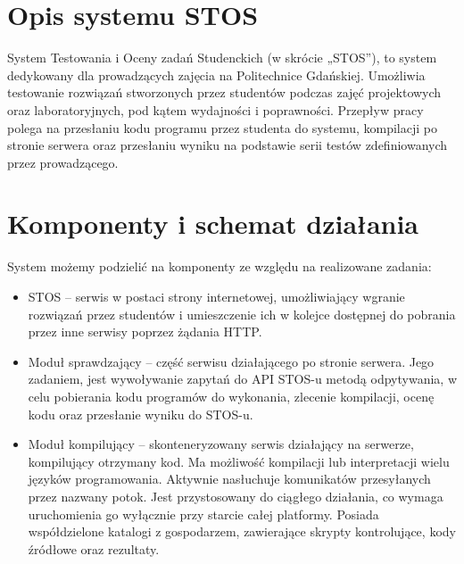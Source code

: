 \section{Opis systemu STOS}
\indent System Testowania i Oceny zadań Studenckich (w skrócie „STOS”), to system dedykowany dla prowadzących zajęcia na Politechnice Gdańskiej. Umożliwia testowanie rozwiązań stworzonych przez studentów podczas zajęć projektowych oraz laboratoryjnych, pod kątem wydajności i poprawności. Przepływ pracy polega na przesłaniu kodu programu przez studenta do systemu, kompilacji po stronie serwera oraz przesłaniu wyniku na podstawie serii testów zdefiniowanych przez prowadzącego.

\section{Komponenty i schemat działania}
System możemy podzielić na komponenty ze względu na realizowane zadania:
\begin{itemize}
    \item STOS -- serwis w postaci strony internetowej, umożliwiający wgranie rozwiązań przez studentów i umieszczenie ich w kolejce dostępnej do pobrania przez inne serwisy poprzez żądania HTTP.
    \item Moduł sprawdzający -- część serwisu działającego po stronie serwera. Jego zadaniem, jest wywoływanie zapytań do API STOS-u metodą odpytywania, w celu pobierania kodu programów do wykonania, zlecenie kompilacji, ocenę kodu oraz przesłanie wyniku do STOS-u.
    \item Moduł kompilujący -- skonteneryzowany serwis działający na serwerze, kompilujący otrzymany kod. Ma możliwość kompilacji lub interpretacji wielu języków programowania. Aktywnie nasłuchuje komunikatów przesyłanych przez nazwany potok. Jest przystosowany do ciągłego działania, co wymaga uruchomienia go wyłącznie przy starcie całej platformy. Posiada współdzielone katalogi z gospodarzem, zawierające skrypty kontrolujące, kody źródłowe oraz rezultaty.
\end{itemize}
